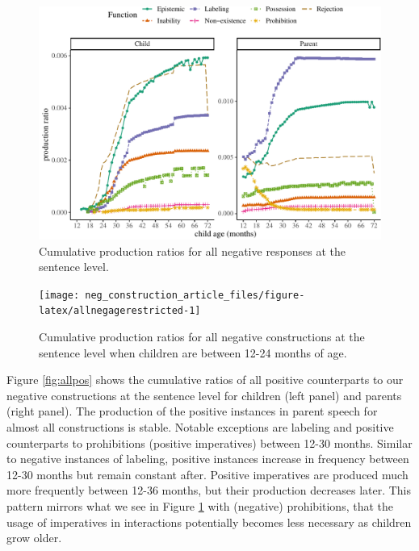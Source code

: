 \documentclass[
  man,floatsintext]{apa6}
\begin{document}
\begin{figure}[H]

{\centering \includegraphics{neg_construction_article_files/figure-latex/allneg-1} 

}

\caption{Cumulative production ratios for all negative responses at the sentence level.}\label{fig:allneg}
\end{figure}

\begin{figure}[H]

{\centering \texttt{[image: neg\_construction\_article\_files/figure-latex/allnegagerestricted-1]} 

}

\caption{Cumulative production ratios for all negative constructions at the sentence level when children are between 12-24 months of age.}\label{fig:allnegagerestricted}
\end{figure}

Figure \ref{fig:allpos} shows the cumulative ratios of all positive counterparts to our negative constructions at the sentence level for children (left panel) and parents (right panel). The production of the positive instances in parent speech for almost all constructions is stable. Notable exceptions are labeling and positive counterparts to prohibitions (positive imperatives) between 12-30 months. Similar to negative instances of labeling, positive instances increase in frequency between 12-30 months but remain constant after. Positive imperatives are produced much more frequently between 12-36 months, but their production decreases later. This pattern mirrors what we see in Figure \ref{fig:allneg} with (negative) prohibitions, that the usage of imperatives in interactions potentially becomes less necessary as children grow older.
\end{document}
